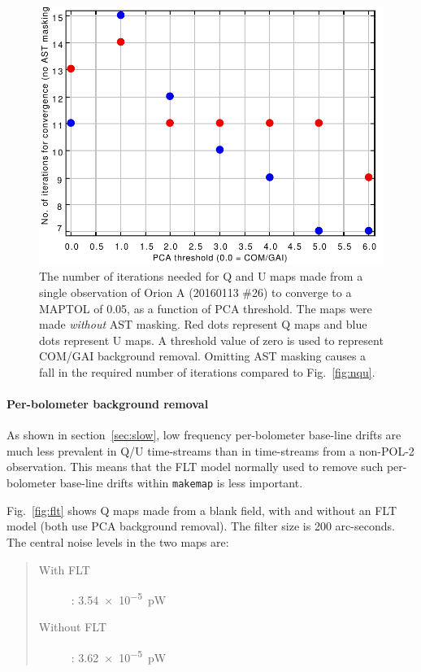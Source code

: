 \documentclass[twoside,11pt]{starlink}
\begin{document}
\begin{figure}
\includegraphics[width=\columnwidth]{nqu_noast}
\caption{The number of iterations needed for Q and U maps made from a
single observation of Orion A (20160113 \#26) to converge to a MAPTOL
of 0.05, as a function of PCA threshold. The maps were made \emph{without}
AST masking. Red dots represent Q maps and blue dots represent U maps. A
threshold value of zero is used to  represent COM/GAI background removal.
Omitting AST masking causes a fall in the required number of iterations
compared to Fig.~\ref{fig:nqu}.}
\label{fig:nqu_noast}
\end{figure}

\paragraph{Per-bolometer background removal}
\label{sec:flt}
As shown in section~\ref{sec:slow}, low frequency per-bolometer base-line
drifts are much less prevalent in Q/U time-streams than in time-streams
from a non-POL-2 observation. This means that the FLT model normally used
to remove such per-bolometer base-line drifts within \texttt{makemap} is
less important.

Fig.~\ref{fig:flt} shows Q maps made from a blank field, with and without
an FLT model (both use PCA background removal). The filter size is 200
arc-seconds. The central noise levels in the two maps are:

\begin{quote}
\begin{description}
\item[With FLT]: \SI{3.54e-5}{pW}
\item[Without FLT]: \SI{3.62e-5}{pW}
\end{description}
\end{quote}
\end{document}
